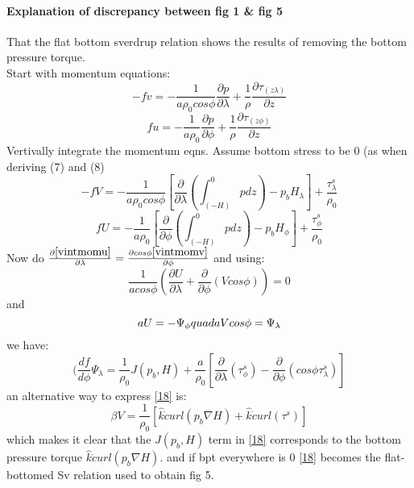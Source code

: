 \documentclass[..\Papers.tex]{subfiles}
\begin{document}
\paragraph{Explanation of discrepancy between fig 1 \& fig 5}
That the flat bottom sverdrup relation shows the results of removing the bottom pressure torque.
\\ Start with momentum equations:
    \begin {equation} \label{momv}
        -fv = - \frac{1}{a\rho_0 cos\phi}\frac{\partial p}{\partial \lambda} + \frac{1}{\rho}\frac{\partial \tau_(z\lambda)}{\partial z}
    \end {equation}
    \begin {equation} \label{momu}
        fu = - \frac{1}{a\rho_0}\frac{\partial p}{\partial \phi} + \frac{1}{\rho}\frac{\partial \tau_(z\phi)}{\partial z}
    \end {equation}
Vertivally integrate the momentum eqns. Assume bottom stress to be 0 (as when deriving (7) and (8) 
    \begin {equation} \label{vintmomv}
        -fV = - \frac{1}{a\rho_0 cos\phi}[\frac{\partial}{\partial \lambda} ( \int_(-H)^0 p dz) - p_b H_\lambda ] + \frac{\tau_\lambda^s}{\rho_0}
    \end {equation}
    \begin {equation} \label{vintmomu}
        fU = - \frac{1}{a\rho_0}[\frac{\partial}{\partial \phi}(\int_(-H)^0 p dz) - p_b H_\phi] + \frac{\tau_\phi^s}{\rho_0}
    \end{equation}
Now do $\frac{\partial \ref{vintmomu}}{\partial\lambda} = \frac{\partial cos\phi\ref{vintmomv}}{\partial\phi}$ and using:
    \begin{equation} \label{vintcontinuity}
        \frac{1}{acos\phi}(\frac{\partial U}{\partial\lambda}+\frac{\partial}{\partial\phi}(Vcos\phi))=0
    \end {equation}
and
    \begin{equation} \label{streamfunction}
        aU=-\Psi_\phi \\quad aVcos\phi=\Psi_\lambda
    \end {equation}
we have:
    \begin{equation} \label{18}
        (\frac{df}{d\phi}\Psi_\lambda=\frac{1}{\rho_0}J(p_b,H)+\frac{a}{\rho_0}[\frac{\partial}{\partial\lambda}(\tau_\phi^s)-\frac{\partial}{\partial\phi}(cos\phi\tau_\lambda^s)]
    \end{equation}
an alternative way to express \ref{18} is:
    \begin{equation} \label{19}
        \beta V = \frac{1}{\rho_0}[\hat{k} \dot curl(p_b\nabla H) + \hat{k}\dot curl(\tau^s)]
    \end{equation}
which makes it clear that the $J(p_b,H)$ term in \ref{18} corresponds to the bottom pressure torque $\hat{k}\dot curl(p_b\nabla H)$. and if bpt everywhere is 0 \ref{18} becomes the flat-bottomed Sv relation used to obtain fig 5.
\end{document}
